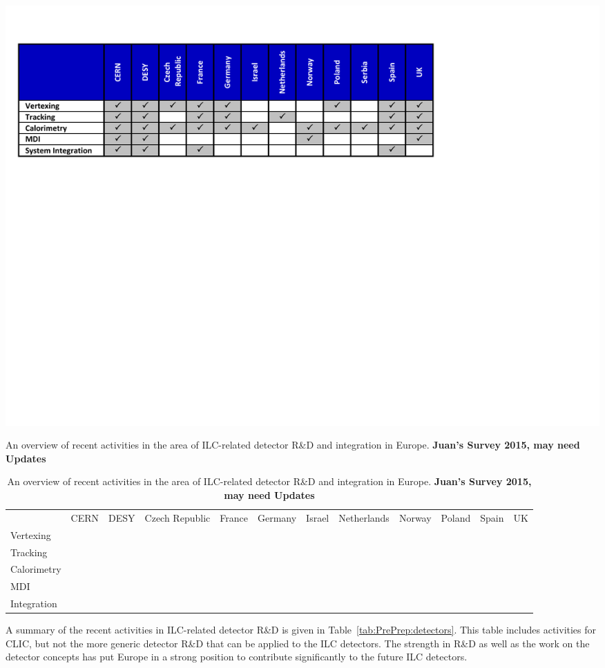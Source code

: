 \documentclass[%
 reprint,
 amsmath,amssymb,
 aps,
]{revtex4-1}
\begin{document}
\begin{table}[htbp]
\includegraphics[width=\hsize]{figures/ILCEAP-Matrices-detectors.pdf}
\caption{\label{tab:PrePrep:detectors} An overview of recent activities in the area of ILC-related detector R\&D and integration in Europe. \bfseries{Juan's Survey 2015, may need Updates}}
\end{table}
\begin{table}[htbp]
    \centering
    \begin{tabular}{l|c|c|c|c|c|c|c|c|c|c|c|}
                   &  CERN & DESY & Czech Republic & France & Germany & Israel & Netherlands & Norway & Poland & Spain & UK \\
         Vertexing &  & & & & & & & & & & \\ \midrule
         Tracking  &  & & & & & & & & & & \\ \midrule
         Calorimetry  &  & & & & & & & & & & \\ \midrule
         MDI  &  & & & & & & & & & & \\ \midrule
         Integration  &  & & & & & & & & & & \\ \bottomrule
    \end{tabular}
    \caption{An overview of recent activities in the area of ILC-related detector R\&D and integration in Europe. \bfseries{Juan's Survey 2015, may need Updates}}
    \label{tab:my_label}
\end{table}


A summary of the recent  activities in ILC-related detector R\&D is given in Table~\ref{tab:PrePrep:detectors}. This table includes activities for CLIC, but not the more generic detector R\&D that can be applied to the 
ILC detectors. The strength in R\&D as well as the work on the detector concepts has put Europe in a strong position to contribute significantly to the future ILC detectors.
\end{document}
